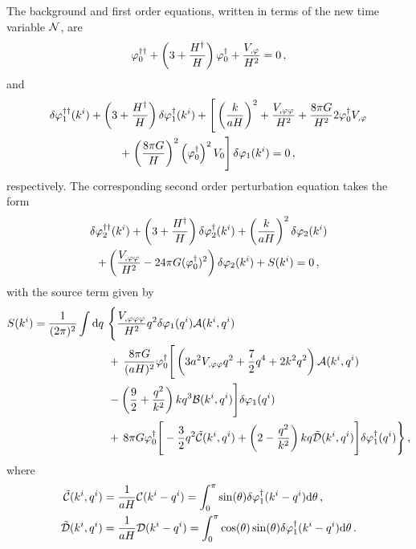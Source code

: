 % 
The background and first order equations, written in terms of the new time
variable $\mathcal{N}$, are
%
\begin{equation}
\varphi_{0}^{\dagger\dagger} + \left(3 + \frac{H^{\dagger}}{H}\right)\varphi_{0}^{\dagger} + \frac{V_{,\varphi}}{H^2} = 0
\,,
\label{eq:bgntime}
\end{equation}
% 
and
% 
\begin{multline}
\ddN{\dvp1}(\kvi) + \left(3 + \frac{\dN{H}}{H}\right)\dN{\dvp1}(\kvi) 
 + \Bigg[ \left(\frac{k}{aH}\right)^2 + \frac{\Upp}{H^2} + \frac{8\pi G}{H^2}
 2\dN{\vp_{0}}\Uphi \\
% 
+ \left.\left(\frac{8\pi G}{H}\right)^2
\left(\dN{\vp_{0}}\right)^2\U \right]\dvp1(\kvi) = 0\,, \label{eq:fontime}
\end{multline}
% 
respectively.
The corresponding second order perturbation equation takes the form
% 
\begin{multline}
 \label{eq:KG2-fourier-sr-ntime}
\ddN{\dvp2}(\kvi) + \left(3 + \frac{\dN{H}}{H}\right)
\dN{\dvp2}(\kvi)+ \left(\frac{k}{aH}\right)^2\dvp2(\kvi) \\
% 
+ \left(\frac{\Upp}{H^2}-{24 \pi G}(\dN{\vp_{0}})^2\right)
\dvp2(\kvi) +S(\kvi) = 0 \,,
\end{multline}
% 
with the source term given by
\begin{align}
\label{eq:KG2-source-ntime}
S(\kvi) = \frac{1}{(2\pi)^2}\int \d q\ &\Bigg\{
\frac{\Uppp}{H^2} q^2 \dvp1(\qvi) \A(\kvi,\qvi) \nonumber\\
&+\, \frac{8\pi G}{(aH)^2}\dN{\vp_{0}} \Bigg[ 
\left( 3a^2\Upp q^2 + \frac{7}{2}q^4 + 2k^2q^2\right) \A(\kvi,\qvi) \nonumber\\
% 
&-\left(\frac{9}{2} + \frac{q^2}{k^2}\right)kq^3 \B(\kvi,\qvi)
\Bigg]\dvp1(\qvi) \nonumber\\
%
&+\, 8\pi G \dN{\vp_{0}} \Bigg[
-\frac{3}{2}q^2 \tilde{\C}(\kvi,\qvi) + \left(2-\frac{q^2}{k^2}\right)kq
\tilde{\D}(\kvi,\qvi) 
\Bigg]\dN{\dvp1}(\qvi) \Bigg\}\,,
%
\end{align}
%
where 
%
\begin{align}
\label{eq:cdtilde-num}
 \tilde{\mathcal{C}}(k^i,q^i) &= \frac{1}{aH} \mathcal{C}(k^i-q^i) = \int_0^\pi \sin(\theta)
\delta\varphi_{1}^{\dagger}(k^i-q^i) \mathrm{d}\theta \,,\nonumber \\
 \tilde{\mathcal{D}}(k^i,q^i) &= \frac{1}{aH} \mathcal{D}(k^i-q^i) = \int_0^\pi \cos(\theta)
\sin(\theta) \delta\varphi_{1}^{\dagger}(k^i-q^i)
\mathrm{d}\theta \,.
\end{align}



